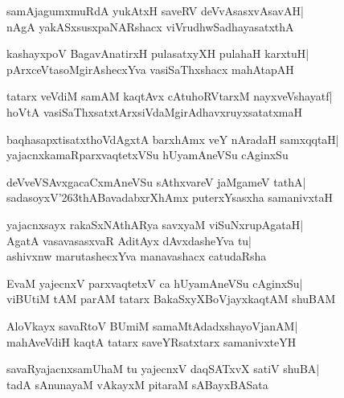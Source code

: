 \documentclass[twoside,12pt,openright]{book}
\def\S{\char'263}
\newcounter{shloka}[chapter]
\begin{document}
\begin{shloka}%
samAjagumxmuRdA yukAtxH saveRV deVvAsasxvAsavAH|\\
nAgA yakASxsusxpaNARshacx viVrudhwSadhayasatxthA
\end{shloka}

\begin{shloka}%
kashayxpoV BagavAnatirxH pulasatxyXH pulahaH karxtuH|\\
pArxceVtasoMgirAshecxYva vasiSaThxshacx mahAtapAH
\end{shloka}

\begin{shloka}%
tatarx veVdiM samAM kaqtAvx cAtuhoRVtarxM nayxveVshayatf|\\
hoVtA vasiSaThxsatxtArxsiVdaMgirAdhavxruyxsatatxmaH
\end{shloka}

\begin{shloka}%
baqhasapxtisatxthoVdAgxtA barxhAmx veY nAradaH samxqqtaH|\\
yajacnxkamaRparxvaqtetxVSu hUyamAneVSu cAginxSu
\end{shloka}

\begin{shloka}%
deVveVSAvxgacaCxmAneVSu sAthxvareV jaMgameV tathA|\\
sadasoyxV\S thABavadabxrXhAmx puterxYsasxha samanivxtaH
\end{shloka}

\begin{shloka}%
yajacnxsayx rakaSxNAthARya savxyaM viSuNxrupAgataH|\\
AgatA vasavasasxvaR AditAyx dAvxdasheYva tu|\\
ashivxnw marutashecxYva manavashacx catudaRsha
\end{shloka}

\begin{shloka}%
EvaM yajecnxV parxvaqtetxV ca hUyamAneVSu cAginxSu|\\
viBUtiM tAM parAM tatarx BakaSxyXBoVjayxkaqtAM shuBAM
\end{shloka}

\begin{shloka}%
AloVkayx savaRtoV BUmiM samaMtAdadxshayoVjanAM|\\
mahAveVdiH kaqtA tatarx saveYRsatxtarx samanivxteYH
\end{shloka}

\begin{shloka}%
savaRyajacnxsamUhaM tu yajecnxV daqSATxvX satiV shuBA|\\
tadA sAnunayaM vAkayxM pitaraM sABayxBASata
\end{shloka}
\end{document}
